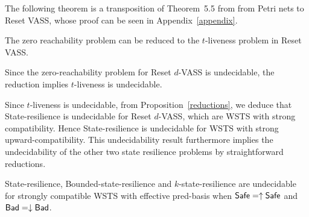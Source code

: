The following theorem is a transposition of Theorem~5.5 from \cite{peterson1981petri} from Petri nets to Reset VASS, whose proof can be seen in Appendix~\ref{appendix}.

\begin{proposition}\label{liveness reset}
The  zero reachability problem can be reduced to the $t$-liveness problem in Reset VASS.
\end{proposition}



Since the zero-reachability problem for Reset $d$-VASS is undecidable, the reduction implies 
%
%
{\sc %
$t$-liveness} is undecidable.




Since {\sc %
$t$-liveness} is undecidable, from Proposition~\ref{reductions},  we deduce that {\sc State-resilience} is undecidable  for Reset $d$-VASS, which are WSTS with strong compatibility. Hence {\sc State-resilience} is undecidable  for WSTS with strong upward-compatibility. This undecidability result furthermore implies the undecidability of the other two state resilience problems by straightforward reductions.


\begin{theorem}\label{srp up down}
{\sc State-resilience},
{\sc Bounded-state-resilience} and
{\sc $k$-state-resilience}
are undecidable for strongly compatible WSTS with effective pred-basis
when
$\textsf{Safe}=\uparrow \textsf{Safe}$
and $\textsf{Bad}=\downarrow \textsf{Bad}$.
\end{theorem}


